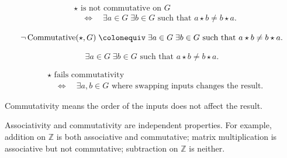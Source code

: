 \begin{remark*}
\[
\begin{aligned}
&\star \text{ is not commutative on } G \\
&\quad\Longleftrightarrow\quad
\exists a \in G\;\exists b \in G \text{ such that } a \star b \ne b \star a.
\end{aligned}
\]
\end{remark*}

\begin{remark*}
\[
\neg \operatorname{Commutative}(\star, G)
\;\colonequiv\;
\exists a \in G\;\exists b \in G \text{ such that } a \star b \ne b \star a.
\]
\end{remark*}

\begin{remark*}
\[
\exists a \in G\;\exists b \in G \text{ such that } a \star b \ne b \star a.
\]
\end{remark*}

\begin{remark*}
\[
\begin{aligned}
&\star \text{ fails commutativity} \\
&\quad\Longleftrightarrow\quad
\exists a,b \in G \text{ where swapping inputs changes the result.}
\end{aligned}
\]
\end{remark*}

\begin{remark*}[Interpretation]
Commutativity means the order of the inputs does not affect the result.
\end{remark*}


\begin{remark*}[Interpretation]
Associativity and commutativity are independent properties. For example,
addition on $\mathbb{Z}$ is both associative and commutative; matrix
multiplication is associative but not commutative; subtraction on
$\mathbb{Z}$ is neither.
\end{remark*}
































